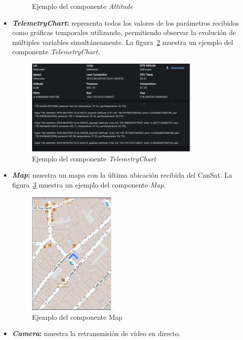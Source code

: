 \begin{itemize}
\begin{figure}[H]
        \caption{Ejemplo del componente \emph{Attitude}}
        \label{fig:attitude}
    \end{figure}
    \item \textbf{\emph{TelemetryChart}:} representa todos los valores de los parámetros recibidos como gráficas temporales utilizando, permitiendo observar la evolución de múltiples variables simultáneamente.
    La figura~\ref{fig:telemetry_chart} muestra un ejemplo del componente \emph{TelemetryChart}.
    \begin{figure}[H]
        \centering
        \includegraphics[width=0.8\textwidth]{Imagenes/Bitmap/telemetry_chart}
        \caption{Ejemplo del componente \emph{TelemetryChart}}
        \label{fig:telemetry_chart}
    \end{figure}
    \item \textbf{\emph{Map}:} muestra un mapa con la última ubicación recibida del CanSat.
    La figura~\ref{fig:map} muestra un ejemplo del componente \emph{Map}.
    \begin{figure}[H]
        \centering
        \includegraphics[width=0.4\textwidth]{Imagenes/Bitmap/map}
        \caption{Ejemplo del componente Map}
        \label{fig:map}
    \end{figure}
    \item \textbf{\emph{Camera}:} muestra la retransmisión de vídeo en directo.
\end{itemize}
